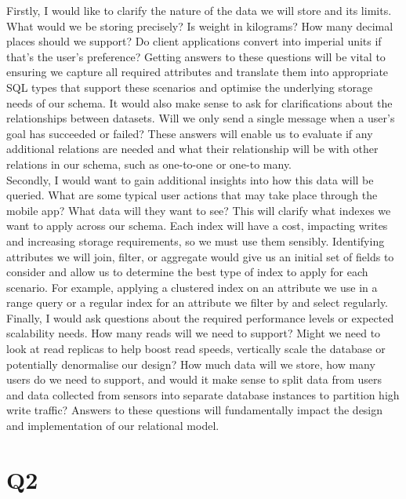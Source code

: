 \documentclass{article}
\begin{document}
Firstly, I would like to clarify the nature of the data we will store and its limits. What would we be storing precisely? Is weight in kilograms? How many decimal places should we support? Do client applications convert into imperial units if that's the user's preference? Getting answers to these questions will be vital to ensuring we capture all required attributes and translate them into appropriate SQL types that support these scenarios and optimise the underlying storage needs of our schema. It would also make sense to ask for clarifications about the relationships between datasets. Will we only send a single message when a user's goal has succeeded or failed? These answers will enable us to evaluate if any additional relations are needed and what their relationship will be with other relations in our schema, such as one-to-one or one-to many. \\
\newline
Secondly, I would want to gain additional insights into how this data will be queried. What are some typical user actions that may take place through the mobile app? What data will they want to see? This will clarify what indexes we want to apply across our schema. Each index will have a cost, impacting writes and increasing storage requirements, so we must use them sensibly. Identifying attributes we will join, filter, or aggregate would give us an initial set of fields to consider and allow us to determine the best type of index to apply for each scenario. For example, applying a clustered index on an attribute we use in a range query or a regular index for an attribute we filter by and select regularly. \\
\newline
Finally, I would ask questions about the required performance levels or expected scalability needs. How many reads will we need to support? Might we need to look at read replicas to help boost read speeds, vertically scale the database or potentially denormalise our design? How much data will we store, how many users do we need to support, and would it make sense to split data from users and data collected from sensors into separate database instances to partition high write traffic? Answers to these questions will fundamentally impact the design and implementation of our relational model. \\
\pagebreak

\section*{Q2}
\end{document}
